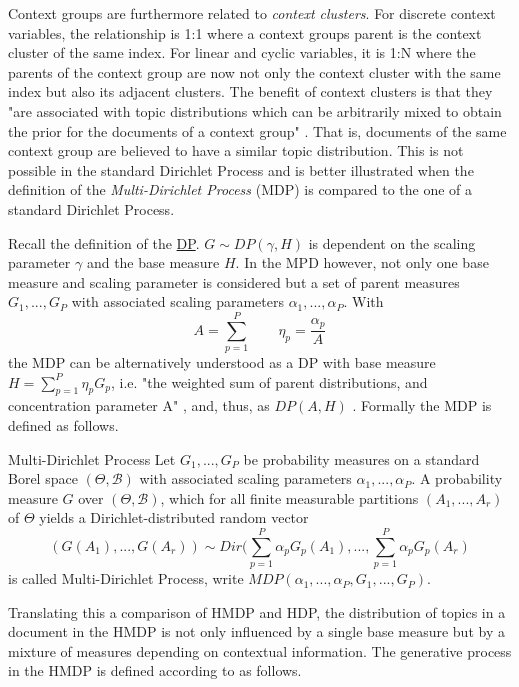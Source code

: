Context groups are furthermore related to \textit{context clusters}. For discrete context variables, the relationship is 1:1 where a context groups parent is the context cluster of the same index. For linear and cyclic variables, it is 1:N where the parents of the context group are now not only the context cluster with the same index but also its adjacent clusters. The benefit of context clusters is that they "are associated with topic distributions which can be arbitrarily mixed to obtain the prior for the documents of a context group" \cite{DBLP:phd/dnb/Kling16}. That is, documents of the same context group are believed to have a similar topic distribution. This is not possible in the standard Dirichlet Process and is better illustrated when the definition of the \textit{Multi-Dirichlet Process} \cite{Kling:2014:DNG:2556195.2556218} (MDP) is compared to the one of a standard Dirichlet Process. \par
Recall the definition of the \hyperref[DP]{DP}. $G \sim DP(\gamma, H)$ is dependent on the scaling parameter $\gamma$ and the base measure $H$. In the MPD however, not only one base measure and scaling parameter is considered but a set of parent measures $G_1,...,G_P$ with associated scaling parameters $\alpha_1,...,\alpha_P$. With \begin{equation}
A = \sum_{p=1}^P \quad \quad \eta_p = \frac{\alpha_p}{A} 
\end{equation}
the MDP can be alternatively understood as a DP with base measure $H = \sum_{p=1}^P \eta_pG_p$, i.e. "the weighted sum of parent distributions, and concentration parameter A" \cite{Kling:2014:DNG:2556195.2556218}, and, thus, as $DP(A, H)$ \cite{Kling:2014:DNG:2556195.2556218}.
Formally the MDP is defined as follows.
\begin{definition}{Multi-Dirichlet Process \cite{Kling:2014:DNG:2556195.2556218}}
Let $G_1,...,G_P$ be probability measures on a standard Borel space $(\Theta, \mathcal{B})$ with associated scaling parameters $\alpha_1,...,\alpha_P$.
A probability measure $G$ over $(\Theta, \mathcal{B})$, which for all finite measurable partitions $(A_1,...,A_r)$ of $\Theta$ yields a Dirichlet-distributed random vector \begin{equation}
(G(A_1),...,G(A_r)) \sim Dir(\sum_{p=1}^P\alpha_pG_p(A_1),...,\sum_{p=1}^P\alpha_pG_p(A_r)
\end{equation} is called Multi-Dirichlet Process, write $MDP(\alpha_1,...,\alpha_P,G_1,...,G_P)$.
\end{definition}
Translating this a comparison of HMDP and HDP, the distribution of topics in a document in the HMDP is not only influenced by a single base measure but by a mixture of measures depending on contextual information. The generative process in the HMDP is defined according to \cite{DBLP:phd/dnb/Kling16} as follows.

